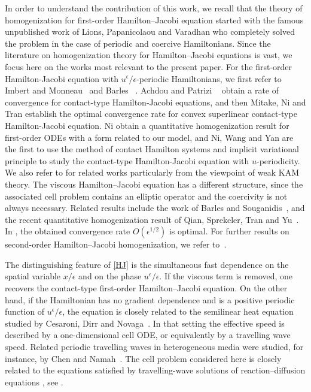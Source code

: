 \documentclass[preprint]{elsarticle}
\numberwithin{equation}{section}
\begin{document}
In order to understand the contribution of this work, we recall that the theory of homogenization for first-order Hamilton–Jacobi equation started with the famous unpublished work of Lions, Papanicolaou and Varadhan \cite{LionsPapanicolaouVaradhan1987} who completely solved the problem in the case of periodic and coercive Hamiltonians. Since the literature on homogenization theory for Hamilton--Jacobi equations is vast, we focus here on the works most relevant to the present paper. For the first-order Hamilton-Jacobi equation with $u^\epsilon/\epsilon$-periodic Hamiltonians, we first refer to Imbert and Monneau~\cite{imbert2008homogenization} and Barles ~\cite{barles2007some}. Achdou and Patrizi ~\cite{achdou2011homogenization} obtain a rate of convergence for contact-type Hamilton-Jacobi equations, and then Mitake, Ni and Tran \cite{mitake2025quantitative} establish the optimal convergence rate for convex superlinear contact-type Hamilton-Jacobi equation. Ni \cite{ni2025quantitative} obtain a quantitative homogenization result for first-order ODEs with a form related to our model, and Ni, Wang and Yan \cite{ni2023viscosity} are the first to use the method of contact Hamilton systems and implicit variational principle to study the contact-type Hamilton-Jacobi equation with $u$-periodicity. We also refer to \cite{wang2017implicit, wang2019aubry, wang2019variational} for related works particularly from the viewpoint of weak KAM theory. The viscous Hamilton--Jacobi equation has a different structure, since the associated cell problem contains an elliptic operator and the coercivity is not always necessary. Related results include the work of Barles and Souganidis~\cite{barles2001space}, and the recent quantitative homogenization result of Qian, Sprekeler, Tran and Yu~\cite{qian2024optimal}. In \cite{qian2024optimal}, the obtained convergence rate $O(\epsilon^{1/2})$ is optimal. For further results on second-order Hamilton--Jacobi homogenization, we refer to~\cite{LionsSouganidis2005,LionsSouganidis2005Viscous,Evans1992,tran2021hamilton}.


The distinguishing feature of \eqref{HJ} is the simultaneous fast dependence on the spatial variable $x/\epsilon$ and on the phase $u^\epsilon/\epsilon$. If the viscous term is removed, one recovers the contact-type first-order Hamilton--Jacobi equation. On the other hand, if the Hamiltonian has no gradient dependence and is a positive periodic function of $u^\epsilon/\epsilon$, the equation is closely related to the semilinear heat equation studied by Cesaroni, Dirr and Novaga~\cite{cesaroni2017homogenization}. In that setting the effective speed is described by a one-dimensional cell ODE, or equivalently by a travelling wave speed. Related periodic travelling waves in heterogeneous media were studied, for instance, by Chen and Namah~\cite{ChenNamah2002}. The cell problem considered here is closely related to the equations satisfied by travelling-wave solutions of reaction--diffusion equations , see \cite{berestycki2005speed,berestycki2007generalized, zhang2022homogenization}.  
\end{document}
